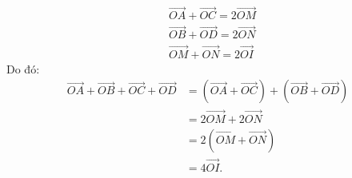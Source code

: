 \begin{bt}
{\begin{align*}
& \vec {OA}  +  \vec {OC}=2\vec {OM} \\ 
& \vec {OB}  +  \vec {OD}=2\vec {ON} \\ 
& \vec {OM}  +  \vec {ON}=2\vec {OI}
\end{align*} 
Do đó:
\begin{align*}
\vec {OA}  +  \vec {OB}  +  \vec {OC}  +  \vec {OD}  &=  \left(\vec {OA}  +  \vec {OC}\right)  +  \left(\vec {OB}  +  \vec {OD}\right) \\ 
&=2\vec {OM}  +  2\vec {ON} \\ 
&=2\left(\vec {OM}  +  \vec {ON}\right) \\ 
&=4\vec {OI}. 
\end{align*} 
}
\end{bt}


